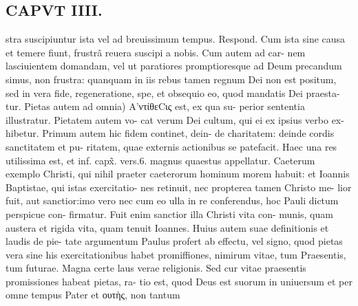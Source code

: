 \documentclass{article}
\begin{document}
\begin{pages}
\section*{CAPVT  IIII. }
\marginpar{[ p.211 ]}stra suscipiuntur ista vel ad breuissimum tempus. Respond. Cum ista sine causa et temere fiunt, frustrâ reuera suscipi a nobis. Cum autem ad car- nem lasciuientem domandam, vel ut paratiores promptioresque ad Deum precandum simus, non frustra: quanquam in iis rebus tamen regnum Dei non est positum, sed in vera fide, regeneratione, spe, et obsequio eo, quod mandatis Dei praesta- tur. Pietas autem ad omnia) Α'ντίθεCις est, ex qua su- perior sententia illustratur. Pietatem autem vo- cat verum Dei cultum, qui ei ex ipsius verbo ex- hibetur. Primum autem hic fidem continet, dein- de charitatem: deinde cordis sanctitatem et pu- ritatem, quae externis actionibus se patefacit. Haec una res utilissima est, et inf. capx̃. vers.6. magnus quaestus appellatur. Caeterum exemplo Christi, qui nihil praeter caeterorum hominum morem habuit: et Ioannis Baptistae, qui istas exercitatio- nes retinuit, nec propterea tamen Christo me- lior fuit, aut sanctior:imo vero nec cum eo ulla in re conferendus, hoc Pauli dictum perspicue con- firmatur. Fuit enim sanctior illa Christi vita con- munis, quam austera et rigida vita, quam tenuit Ioannes. Huius autem suae definitionis et laudis de pie- tate argumentum Paulus profert ab effectu, vel signo, quod pietas vera sine his exercitationibus habet promiffiones, nimirum vitae, tum Praesentis, tum futurae. Magna certe laus verae religionis. Sed cur vitae praesentis promissiones habeat pietas, ra- tio est, quod Deus est suorum in uniuersum et per omne tempus Pater et ουτὴς, non tantum 

\end{pages}
\end{document}
